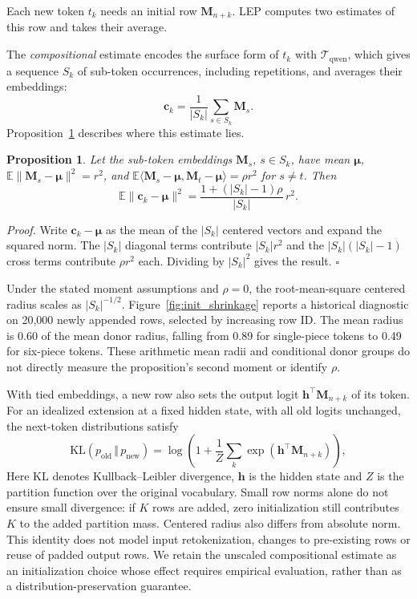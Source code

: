 \documentclass{ieeeaccess}
\newtheorem{proposition}{Proposition}
\begin{document}
Each new token $t_k$ needs an initial row $\bm{M}_{n+k}$. LEP computes two
estimates of this row and takes their average.

The \emph{compositional} estimate encodes the surface form of $t_k$ with
$\mathcal{T}_{\mathrm{qwen}}$, which gives a sequence $S_k$ of sub-token
occurrences, including repetitions, and
averages their embeddings:
\begin{equation}
\bm{c}_k = \frac{1}{|S_k|} \sum_{s \in S_k} \bm{M}_s .
\label{eq:comp}
\end{equation}
Proposition~\ref{prop:shrink} describes where this estimate lies.

\begin{proposition}
\label{prop:shrink}
Let the sub-token embeddings $\bm{M}_s$, $s \in S_k$, have mean $\bm{\mu}$,
$\mathbb{E}\lVert \bm{M}_s - \bm{\mu} \rVert^2 = r^2$, and
$\mathbb{E}\langle \bm{M}_s - \bm{\mu}, \bm{M}_t - \bm{\mu} \rangle = \rho r^2$ for $s \neq t$.
Then
\begin{equation}
\mathbb{E}\lVert \bm{c}_k - \bm{\mu} \rVert^2 = \frac{1 + (|S_k| - 1)\rho}{|S_k|}\, r^2 .
\end{equation}
\end{proposition}

\emph{Proof.} Write $\bm{c}_k - \bm{\mu}$ as the mean of the $|S_k|$ centered vectors
and expand the squared norm. The $|S_k|$ diagonal terms contribute
$|S_k| r^2$ and the $|S_k|(|S_k| - 1)$ cross terms contribute $\rho r^2$ each.
Dividing by $|S_k|^2$ gives the result. \hfill$\square$

Under the stated moment assumptions and $\rho=0$, the root-mean-square
centered radius scales as $|S_k|^{-1/2}$. Figure~\ref{fig:init_shrinkage}
reports a historical diagnostic on 20{,}000 newly appended rows, selected
by increasing row ID.
The mean radius is 0.60 of the mean donor radius, falling from 0.89 for
single-piece tokens to 0.49 for six-piece tokens. These arithmetic mean
radii and conditional donor groups do not directly measure the proposition's
second moment or identify $\rho$.

With tied
embeddings, a new row also sets the output logit $\bm{h}^\top \bm{M}_{n+k}$ of its
token. For an idealized extension at a fixed hidden state, with all old
logits unchanged, the next-token distributions satisfy
\cite{hewitt2021initializing}
\begin{equation}
\mathrm{KL}\left(p_{\mathrm{old}} \,\Vert\, p_{\mathrm{new}}\right)
= \log\!\left(1 + \frac{1}{Z} \sum_{k} \exp\!\left(\bm{h}^\top \bm{M}_{n+k}\right)\right),
\label{eq:kl}
\end{equation}
Here KL denotes Kullback--Leibler divergence, $\bm{h}$ is the hidden state and $Z$ is the partition function over the
original vocabulary. Small row norms alone do not ensure small divergence:
if $K$ rows are added, zero initialization still contributes $K$ to the
added partition mass. Centered
radius also differs from absolute norm. This identity does not model input
retokenization, changes to pre-existing rows or reuse of padded output rows.
We retain the unscaled
compositional estimate as an initialization choice whose effect requires
empirical evaluation, rather than as a distribution-preservation guarantee.
\end{document}
